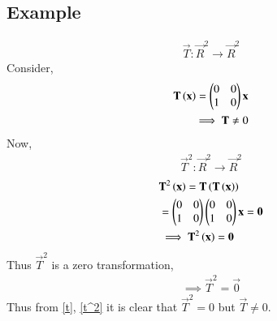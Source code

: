 \documentclass[journal,12pt,twocolumn]{IEEEtran}
\begin{document}
\subsection{Example}
\begin{align}
    \vec{T} : \vec{R}^2 \xrightarrow{} \vec{R}^2
\end{align}
Consider, 
\begin{align}
    \mathbf{T}\left(\mathbf{x}\right) = \begin{pmatrix}0&0\\1&0\end{pmatrix}\mathbf{x} \\
    \implies \mathbf{T} \ne 0 \label{t}
\end{align}
Now,
\begin{align}
    \vec{T}^2 : \vec{R}^2 \xrightarrow{} \vec{R}^2
\end{align}
\begin{align}
    &\mathbf{T}^2\left(\mathbf{x}\right) = \mathbf{T}\left(\mathbf{T}\left(\mathbf{x}\right)\right) \\
    &= \begin{pmatrix}0&0\\1&0\end{pmatrix}\begin{pmatrix}0&0\\1&0\end{pmatrix}\mathbf{x} = \mathbf{0} \\
    &\implies \mathbf{T}^2\left(\mathbf{x}\right) = \mathbf{0}
\end{align}
Thus $\vec{T}^2$ is a zero transformation,
\begin{align}
    \implies \vec{T}^2 = \vec{0} \label{t^2}
\end{align}
Thus from \eqref{t}, \eqref{t^2} it is clear that 
$\vec{T}^2 = 0$ but $\vec{T}\ne 0$.
\end{document}
